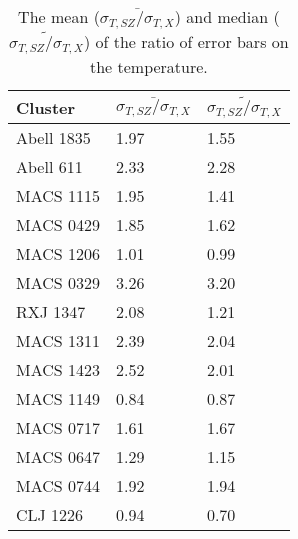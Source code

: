 \documentclass{article}
\begin{document}
\begin{table}
  \centering
  \begin{tabular}{l l l}
    Cluster     & $\bar{\sigma_{T,SZ} / \sigma_{T,X}}$ & $\tilde{\sigma_{T,SZ} / \sigma_{T,X}}$ \\
    \hline   
    Abell 1835  & 1.97 & 1.55 \\
    Abell 611   & 2.33 & 2.28 \\
    MACS 1115   & 1.95 & 1.41 \\
    MACS 0429   & 1.85 & 1.62 \\
    MACS 1206   & 1.01 & 0.99 \\
    MACS 0329   & 3.26 & 3.20 \\
    RXJ 1347    & 2.08 & 1.21 \\
    MACS 1311   & 2.39 & 2.04 \\
    MACS 1423   & 2.52 & 2.01 \\
    MACS 1149   & 0.84 & 0.87 \\
    MACS 0717   & 1.61 & 1.67 \\
    MACS 0647   & 1.29 & 1.15 \\
    MACS 0744   & 1.92 & 1.94 \\
    CLJ 1226    & 0.94 & 0.70 
  \end{tabular}
  \caption{The mean ($\bar{\sigma_{T,SZ} / \sigma_{T,X}}$) and median ($\tilde{\sigma_{T,SZ} / \sigma_{T,X}}$)
    of the ratio of error bars on the temperature.}
\end{table}

\end{document}
